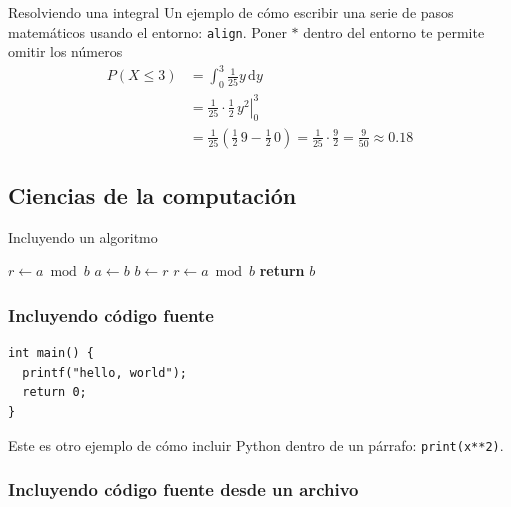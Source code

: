 \begin{frame}{Resolviendo una integral}
Un ejemplo de cómo escribir una serie de pasos matemáticos usando el entorno: \texttt{align}.
Poner $*$ dentro del entorno te permite omitir los números
\begin{align*}
P\left(X \leq 3 \right) &= \int_{0}^{3} \frac{1}{25} y \,\mathrm{d}y \\
     &= \left. \frac{1}{25} \cdot \frac{1}{2} \, y^{2} \right|_0^3 \\
     &= \frac{1}{25} \left( \frac{1}{2} \, 9 - \frac{1}{2} \, 0 \right) =
     \frac{1}{25} \cdot \frac{9}{2} = \frac{9}{50} \approx 0.18 
\end{align*}
\end{frame}

\subsection{Ciencias de la computación}
\begin{frame}{Incluyendo un algoritmo}
\begin{algorithm}[H]
\renewcommand{\thealgorithm}{} %
\caption{de Euclides}
\label{alg:euclid}
\begin{algorithmic}[1] %
     
    \State $r\gets a \bmod b$
     
        \State $a \gets b$
        \State $b \gets r$
        \State $r \gets a \bmod b$
    \EndWhile
    \State \textbf{return} $b$
    \EndProcedure
\end{algorithmic}
\end{algorithm}

\end{frame}

\begin{frame}[fragile] %
\frametitle{Incluyendo código fuente}
\begin{listing}
\begin{verbatim}
int main() {
  printf("hello, world");
  return 0;
}
\end{verbatim}
\caption{Un programa de ejemplo en C}
\end{listing}

Este es otro ejemplo de cómo incluir Python dentro de un párrafo: \texttt{print(x**2)}.

\end{frame}

\begin{frame}[fragile] %
\frametitle{Incluyendo código fuente desde un archivo}
\end{frame}

